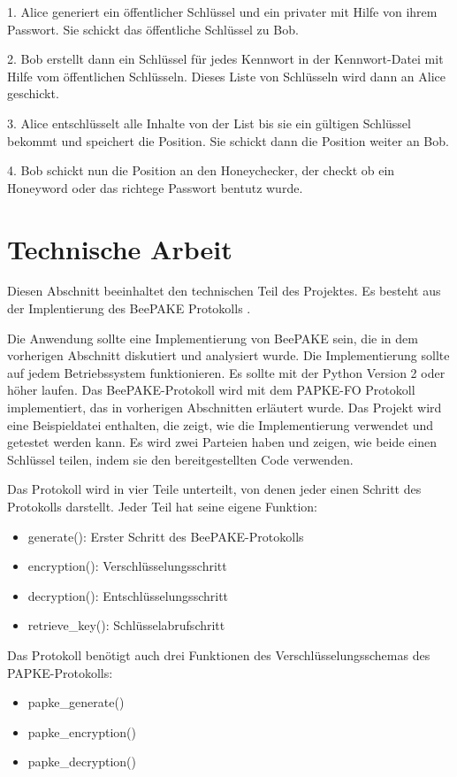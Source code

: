 \documentclass[conference, compsoc]{IEEEtran}
\begin{document}
1. Alice generiert ein öffentlicher Schlüssel und ein privater mit Hilfe von
ihrem Passwort. Sie schickt das öffentliche Schlüssel zu Bob.

2. Bob erstellt dann ein Schlüssel für jedes Kennwort in der Kennwort-Datei
mit Hilfe vom öffentlichen Schlüsseln. Dieses Liste von Schlüsseln wird dann an
Alice geschickt.

3. Alice entschlüsselt alle Inhalte von der List bis sie ein gültigen Schlüssel
bekommt und speichert die Position. Sie schickt dann die Position weiter an Bob.

4. Bob schickt nun die Position an den Honeychecker, der checkt ob ein Honeyword oder
das richtege Passwort bentutz wurde.

\section{Technische Arbeit}
Diesen Abschnitt beeinhaltet den technischen Teil des Projektes. Es besteht aus der 
Implentierung des BeePAKE Protokolls \cite{marjan 2023}.

Die Anwendung sollte eine Implementierung von BeePAKE \cite{marjan2023} sein,
die in dem vorherigen Abschnitt diskutiert und analysiert wurde. Die
Implementierung sollte auf jedem Betriebssystem funktionieren. Es sollte mit
der Python Version 2 oder höher laufen. Das BeePAKE-Protokoll wird mit dem
PAPKE-FO \cite{bradley2019password} Protokoll implementiert, das in vorherigen
Abschnitten erläutert wurde. Das Projekt wird eine Beispieldatei enthalten, die
zeigt, wie die Implementierung verwendet und getestet werden kann. Es wird zwei
Parteien haben und zeigen, wie beide einen Schlüssel teilen, indem sie den
bereitgestellten Code verwenden.

Das Protokoll wird in vier Teile unterteilt, von denen jeder einen Schritt des
Protokolls darstellt. Jeder Teil hat seine eigene Funktion:

\begin{itemize}
	\item generate(): Erster Schritt des BeePAKE-Protokolls
	\item encryption(): Verschlüsselungsschritt
	\item decryption(): Entschlüsselungsschritt
	\item retrieve\_key(): Schlüsselabrufschritt
\end{itemize}

Das Protokoll benötigt auch drei Funktionen des Verschlüsselungsschemas des PAPKE-Protokolls:
\begin{itemize}
	\item papke\_generate()
	\item papke\_encryption()
	\item papke\_decryption()
\end{itemize}
\end{document}
